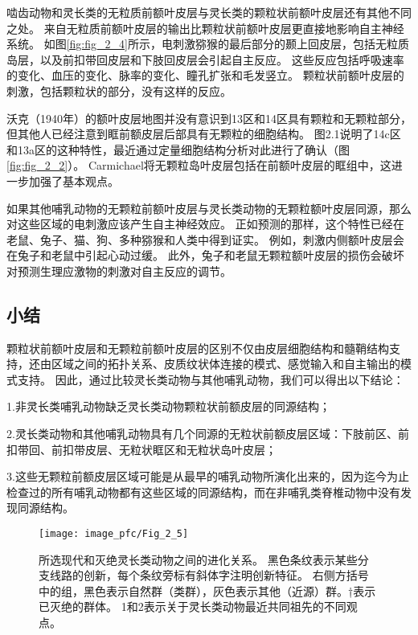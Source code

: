 啮齿动物和灵长类的无粒质前额叶皮层与灵长类的颗粒状前额叶皮层还有其他不同之处。
来自无粒质前额叶皮层的输出比颗粒状前额叶皮层更直接地影响自主神经系统。
如图\ref{fig:fig_2_4}所示，电刺激猕猴的最后部分的颞上回皮层，包括无粒质岛层，以及前扣带回皮层和下肢回皮层会引起自主反应\cite{kaada1960cingulate}。
这些反应包括呼吸速率的变化、血压的变化、脉率的变化、瞳孔扩张和毛发竖立。
颗粒状前额叶皮层的刺激，包括颗粒状的部分，没有这样的反应\cite{kaada1949respiratory}。


沃克（1940年）的额叶皮层地图并没有意识到13区和14区具有颗粒和无颗粒部分，但其他人已经注意到眶前额皮层后部具有无颗粒的细胞结构\cite{carmichael1994architectonic}。
图2.1说明了14c区和13a区的这种特性\cite{mackey2010quantitative}，最近通过定量细胞结构分析对此进行了确认（图\ref{fig:fig_2_2}）。
Carmichael\cite{carmichael1994architectonic}将无颗粒岛叶皮层包括在前额叶皮层的眶组中，这进一步加强了基本观点。


如果其他哺乳动物的无颗粒前额叶皮层与灵长类动物的无颗粒额叶皮层同源，那么对这些区域的电刺激应该产生自主神经效应。
正如预测的那样，这个特性已经在老鼠、兔子、猫、狗、多种猕猴和人类中得到证实。
例如，刺激内侧额叶皮层会在兔子\cite{powell2005single}和老鼠\cite{scopinho2009medial}中引起心动过缓。
此外，兔子\cite{powell1997amygdala}和老鼠\cite{frysztak1994effect}无颗粒额叶皮层的损伤会破坏对预测生理应激物的刺激对自主反应的调节。


\subsection{小结}

颗粒状前额叶皮层和无颗粒前额叶皮层的区别不仅由皮层细胞结构和髓鞘结构支持，还由区域之间的拓扑关系、皮质纹状体连接的模式、感觉输入和自主输出的模式支持。
因此，通过比较灵长类动物与其他哺乳动物，我们可以得出以下结论：\par

1.非灵长类哺乳动物缺乏灵长类动物颗粒状前额皮层的同源结构；\par

2.灵长类动物和其他哺乳动物具有几个同源的无粒状前额皮层区域：下肢前区、前扣带回、前扣带皮层、无粒状眶区和无粒状岛叶皮层；\par

3.这些无颗粒前额皮层区域可能是从最早的哺乳动物所演化出来的，因为迄今为止检查过的所有哺乳动物都有这些区域的同源结构，而在非哺乳类脊椎动物中没有发现同源结构。


\begin{figure}[!htb]
	\centering
	\texttt{[image: image\_pfc/Fig\_2\_5]}
	\caption{所选现代和灭绝灵长类动物之间的进化关系。
		黑色条纹表示某些分支线路的创新，每个条纹旁标有斜体字注明创新特征。
		右侧方括号中的组，黑色表示自然群（类群），灰色表示其他（近源）群。†表示已灭绝的群体。
		1和2表示关于灵长类动物最近共同祖先的不同观点。\label{fig:fig_2_5}}
\end{figure}


